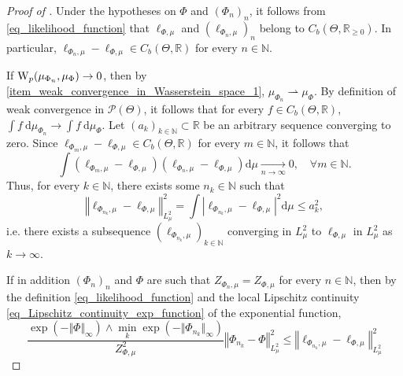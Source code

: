 \documentclass[a4paper]{scrartcl}
\theoremstyle{definition}
\numberwithin{equation}{section}
\newcommand{\R}{\mathbb{R}}
\newcommand{\N}{\mathbb{N}}
\newcommand{\rd}{\mathrm{d}}
\newcommand{\Abs}[1]{\left\vert#1\right\vert}
\newcommand{\norm}[1]{\Vert #1 \Vert}
\newcommand{\Norm}[1]{\left\Vert #1 \right\Vert}
\newcommand{\Was}[0]{\textup{W}}
\begin{document}
\LemmaWassersteinContinuityPosteriorToMisfitMap*
\begin{proof}[Proof of ]
Under the hypotheses on $\Phi$ and $(\Phi_n)_n$, it follows from \eqref{eq_likelihood_function} that $\ell_{\Phi,\mu}$ and $(\ell_{\Phi_n,\mu})_n$ belong to $C_b(\Theta,\R_{\geq 0})$. 
In particular, $\ell_{\Phi_n,\mu}-\ell_{\Phi,\mu}\in C_b(\Theta,\R)$ for every $n\in\N$.

 If $\Was_p(\mu_{\Phi_n},\mu_\Phi)\to 0$, then by \ref{item_weak_convergence_in_Wasserstein_space_1}, $\mu_{\Phi_n}\rightharpoonup\mu_\Phi$.
 By definition of weak convergence in $\mathcal{P}(\Theta)$, it follows that for every $f\in C_b(\Theta,\R)$, $\int f~\rd \mu_{\Phi_n}\to\int f~\rd\mu_\Phi$.
Let $(a_k)_{k\in\N}\subset\R$ be an arbitrary sequence converging to zero. 
 Since $\ell_{\Phi_m,\mu}-\ell_{\Phi,\mu}\in C_b(\Theta,\R)$ for every $m\in\N$, it follows that 
 \begin{equation*}
  \int \left(\ell_{\Phi_m,\mu}-\ell_{\Phi,\mu}\right)\left(\ell_{\Phi_n,\mu}-\ell_{\Phi,\mu}\right)\rd \mu\xrightarrow[n\to\infty]{}0,\quad \forall m\in\N.
 \end{equation*}
Thus, for every $k\in\N$, there exists some $n_k\in\N$ such that
\begin{equation*}
\Norm{\ell_{\Phi_{n_k},\mu}-\ell_{\Phi,\mu}}_{L^2_\mu}^{2} = \int \Abs{\ell_{\Phi_{n_k},\mu}-\ell_{\Phi,\mu}}^2\rd \mu\leq a_k^2,
\end{equation*}
i.e. there exists a subsequence $(\ell_{\Phi_{n_k},\mu})_{k\in\N}$ converging in $L^2_\mu$ to $\ell_{\Phi,\mu}$ in $L^2_\mu$ as $k\to\infty$.

If in addition $(\Phi_n)_n$ and $\Phi$ are such that $Z_{\Phi_n,\mu}=Z_{\Phi,\mu}$ for every $n\in\N$, then by the definition \eqref{eq_likelihood_function} and the local Lipschitz continuity \eqref{eq_Lipschitz_continuity_exp_function} of the exponential function,
\begin{equation*}
\frac{\exp(-\norm{\Phi}_\infty)\wedge \min_k\exp(-\norm{\Phi_{n_k}}_\infty)}{Z_{\Phi,\mu}^2}\Norm{\Phi_{n_k}-\Phi}_{L^2_\mu}^2\leq \Norm{\ell_{\Phi_{n_k},\mu}-\ell_{\Phi,\mu}}_{L^2_\mu}^{2} 
\end{equation*}
\end{proof}
\end{document}
